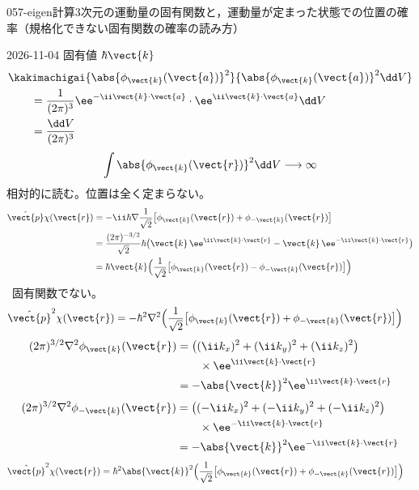 \documentclass[uplatex,dvipdfmx,a4paper,11pt]{jsarticle}
\begin{document}
\begin{mondai}{057-eigen}{計算}{3次元の運動量の固有関数と，運動量が定まった状態での位置の確率（規格化できない固有関数の確率の読み方）}
\begin{kotaeutsushi}{2026-11-04}
固有値 $\hbar\vect{k}$
\begin{align*}
&\kakimachigai{\abs{\phi_{\vect{k}}(\vect{a})}^{2}}{\abs{\phi_{\vect{k}}(\vect{a})}^{2}\dd V}\\
&\qquad=\frac{1}{(2\pi)^{3}}\ee^{-\ii\vect{k}\cdot\vect{a}}\cdot\ee^{\ii\vect{k}\cdot\vect{a}}\dd V\\
&\qquad=\frac{\dd V}{(2\pi)^{3}}
\end{align*}
\[ \int\abs{\phi_{\vect{k}}(\vect{r})}^{2}\dd V\longrightarrow\infty \]
相対的に読む。位置は全く定まらない。
\begin{align*}
\hat{\vect{p}}\chi(\vect{r})&=-\ii\hbar\nabla\frac{1}{\sqrt{2}}\bigl[\phi_{\vect{k}}(\vect{r})+\phi_{-\vect{k}}(\vect{r})\bigr]\\
&=\frac{(2\pi)^{-3/2}}{\sqrt{2}}\hbar\bigl(\vect{k}\,\ee^{\ii\vect{k}\cdot\vect{r}}-\vect{k}\,\ee^{-\ii\vect{k}\cdot\vect{r}}\bigr)\\
&=\hbar\vect{k}\Bigl(\frac{1}{\sqrt{2}}\bigl[\phi_{\vect{k}}(\vect{r})-\phi_{-\vect{k}}(\vect{r})\bigr]\Bigr)
\end{align*}
\ 固有関数でない。
\begin{align*}
\hat{\vect{p}}^{2}\chi(\vect{r})&=-\hbar^{2}\nabla^{2}\Bigl(\frac{1}{\sqrt{2}}\bigl[\phi_{\vect{k}}(\vect{r})+\phi_{-\vect{k}}(\vect{r})\bigr]\Bigr)
\end{align*}
\begin{align*}
(2\pi)^{3/2}\nabla^{2}\phi_{\vect{k}}(\vect{r})&=\bigl((\ii k_{x})^{2}+(\ii k_{y})^{2}+(\ii k_{z})^{2}\bigr)\\
&\qquad\times\ee^{\ii\vect{k}\cdot\vect{r}}\\
&=-\abs{\vect{k}}^{2}\ee^{\ii\vect{k}\cdot\vect{r}}
\end{align*}
\begin{align*}
(2\pi)^{3/2}\nabla^{2}\phi_{-\vect{k}}(\vect{r})&=\bigl((-\ii k_{x})^{2}+(-\ii k_{y})^{2}+(-\ii k_{z})^{2}\bigr)\\
&\qquad\times\ee^{-\ii\vect{k}\cdot\vect{r}}\\
&=-\abs{\vect{k}}^{2}\ee^{-\ii\vect{k}\cdot\vect{r}}
\end{align*}
\begin{align*}
\hat{\vect{p}}^{2}\chi(\vect{r})&=\hbar^{2}\abs{\vect{k}}^{2}\Bigl(\frac{1}{\sqrt{2}}\bigl[\phi_{\vect{k}}(\vect{r})+\phi_{-\vect{k}}(\vect{r})\bigr]\Bigr)

\end{align*}
\end{kotaeutsushi}
\end{mondai}
\end{document}
